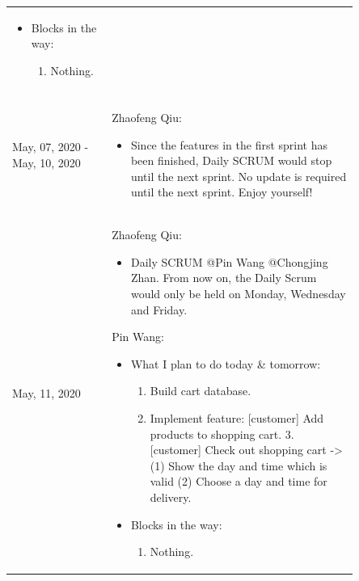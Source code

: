 \documentclass{report}
\begin{document}
\begin{tabularx}{0.95\linewidth}{%
  >{\raggedright\arraybackslash}p{0.2\linewidth}%
  >{\raggedright\arraybackslash}p{0.65\linewidth}}
\begin{itemize}
    \item Blocks in the way: 
      \begin{enumerate}
        \item Nothing.
      \end{enumerate}
  \end{itemize}
  \\
  \\
  \midrule
  May, 07, 2020 - May, 10, 2020
  & Zhaofeng Qiu:
  \begin{itemize}
    \item Since the features in the first sprint has been finished, Daily SCRUM would stop until the next sprint. No update is required until the next sprint. Enjoy yourself!
  \end{itemize}
  \\
  \midrule
  May, 11, 2020
  &
  Zhaofeng Qiu:
  \begin{itemize}
    \item  Daily SCRUM @Pin Wang @Chongjing Zhan. From now on, the Daily Scrum would only be held on Monday, Wednesday and Friday.
  \end{itemize}

  Pin Wang:
  \begin{itemize}
    \item What I plan to do today \& tomorrow: 
    \begin{enumerate}
      \item Build cart database.  
      \item Implement feature: [customer] Add products to shopping cart. 3. [customer] Check out shopping cart -> (1) Show the day and time which is valid (2) Choose a day and time for delivery.
    \end{enumerate}
    \item Blocks in the way: 
    \begin{enumerate}
      \item Nothing.
    \end{enumerate}
  \end{itemize}


\end{tabularx}
\end{document}
